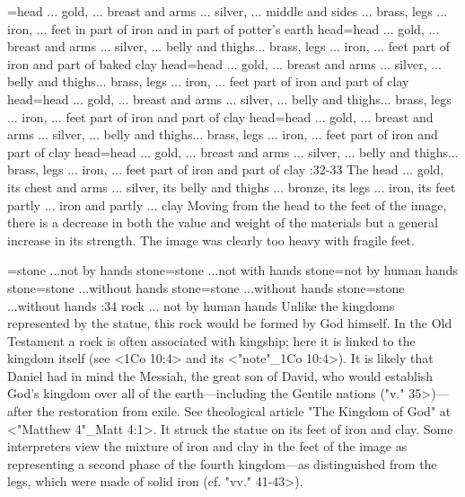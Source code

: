 ={head ... gold, ... breast and arms ... silver, ... middle and sides ... brass, legs ... iron, ... feet in part of iron and in part of potter's earth} %
    {head}={head ... gold, ... breast and arms ... silver, ... belly and thighs... brass, legs ... iron, ... feet  part of iron and part of baked clay} %
    {head}={head ... gold, ... breast and arms ... silver, ... belly and thighs... brass, legs ... iron, ... feet  part of iron and part of clay} %
    {head}={head ... gold, ... breast and arms ... silver, ... belly and thighs... brass, legs ... iron, ... feet  part of iron and part of clay} %
    {head}={head ... gold, ... breast and arms ... silver, ... belly and thighs... brass, legs ... iron, ... feet  part of iron and part of clay} %
    {head}={head ... gold, ... breast and arms ... silver, ... belly and thighs... brass, legs ... iron, ... feet  part of iron and part of clay} %
:32-33 {The head ... gold, its chest and arms ... silver, its 
belly and thighs ... bronze, its legs ... iron, its feet partly ... 
iron and partly ... clay} Moving from the head to the feet of the 
image, there is a decrease in both the value and weight of the materials but a general increase in
its strength. The image was clearly  too heavy with fragile feet.


={stone ...not by hands} %
    {stone}={stone ...not with hands} %
    {stone}={not by human hands} %
    {stone}={stone ...without hands} %
    {stone}={stone ...without hands} %
    {stone}={stone ...without hands} %
:34 {rock ... not by human hands} Unlike the kingdoms represented by the statue, this rock would be
formed by God himself. In  the Old Testament a rock is often associated with kingship; here it 
is linked to the kingdom itself (see <1Co 10:4> and its <"note"_1Co 10:4>).
It is likely that Daniel had in mind the
Messiah, the great son of David, who  
would establish God's kingdom over all of the earth—including the 
Gentile nations (\<"v." 35>)—after the restoration from exile. See theological article "The Kingdom of
God" at <"Matthew 4"_Matt 4:1>. It struck the  
statue on its feet of iron and clay. Some interpreters view the 
mixture of iron and clay in the feet of the image as representing a
second phase of the fourth kingdom—as distinguished from the 
legs, which were made of solid iron (cf. \<"vv." 41-43>).



